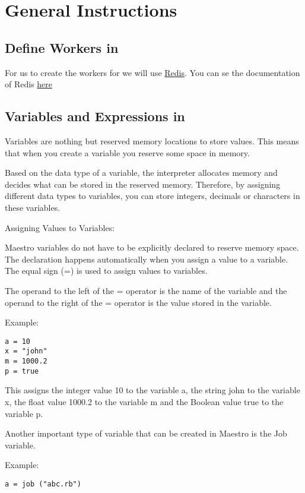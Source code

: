 \section{General Instructions}
\label{sect:general}

\subsection*{Define Workers in \lang{}}
For us to create the workers for \lang{} we will use \href{http://www.redis.io}{Redis}.
You can se the documentation of Redis \href{http://redis.io/documentation}{here}

\subsection*{Variables and Expressions in \lang{}}
Variables are nothing but reserved memory locations to store values. This means that when you create a variable you reserve some space in memory.

Based on the data type of a variable, the interpreter allocates memory and decides what can be stored in the reserved memory. Therefore, by assigning different data types to variables, you can store integers, decimals or characters in these variables.

Assigning Values to Variables:

Maestro variables do not have to be explicitly declared to reserve memory space. The declaration happens automatically when you assign a value to a variable. The equal sign (=) is used to assign values to variables.

The operand to the left of the = operator is the name of the variable and the operand to the right of the = operator is the value stored in the variable. 

Example:
\begin{verbatim}
a = 10
x = "john"
m = 1000.2
p = true
\end{verbatim}

This assigns the integer value 10 to the variable a, the string john to the variable x, the float value 1000.2 to the variable m and the Boolean value true to the variable p.

Another important type of variable that can be created in Maestro is the Job variable.

Example:
\begin{verbatim}
a = job ("abc.rb")
\end{verbatim}

